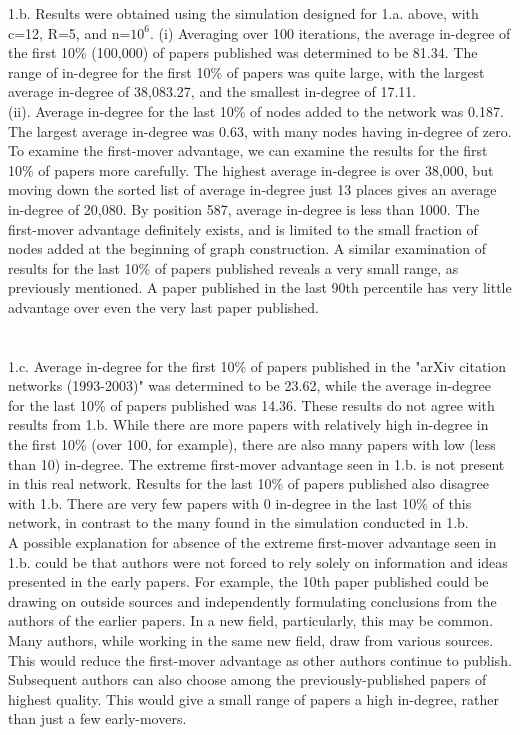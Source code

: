 \documentclass[11pt, oneside]{article}   	%
\begin{document}
 1.b.  Results were obtained using the simulation designed for 1.a. above, with c=12, R=5, and n=$10^6$.
 (i)  Averaging over 100 iterations, the average in-degree of the first 10\% (100,000) of papers published was determined to be 81.34.  The range of in-degree for the first 10\% of papers was quite large, with the largest average in-degree of 38,083.27, and the smallest in-degree of  17.11.\\
 (ii).  Average in-degree for the last 10\% of nodes added to the network was 0.187.  The largest average in-degree was 0.63, with many nodes having in-degree of zero.\\
 \indent To examine the first-mover advantage, we can examine the results for the first 10\% of papers more carefully.  The highest average in-degree is over 38,000, but moving down the sorted list of average in-degree just 13 places gives an average in-degree of 20,080.  By position 587, average in-degree is less than 1000.  The first-mover advantage definitely exists, and is limited to the small fraction of nodes added at the beginning of graph construction.  A similar examination of results for the last 10\% of papers published reveals a very small range, as previously mentioned.  A paper published in the last 90th percentile has very little advantage over even the very last paper published.\\\\\\
 1.c.  Average in-degree for the first 10\% of papers published in the "arXiv citation networks (1993-2003)" was determined to be 23.62, while the average in-degree for the last 10\% of papers published was 14.36.  These results do not agree with results from 1.b.  While there are more papers with relatively high in-degree in the first 10\% (over 100, for example), there are also many papers with low (less than 10) in-degree.  The extreme first-mover advantage seen in 1.b. is not present in this real network.  Results for the last 10\% of papers published also disagree with 1.b.  There are very few papers with 0 in-degree in the last 10\% of this network, in contrast to the many found in the simulation conducted in 1.b.\\
 \indent A possible explanation for absence of the extreme first-mover advantage seen in 1.b. could be that authors were not forced to rely solely on information and ideas presented in the early papers.  For example, the 10th paper published could be drawing on outside sources and independently formulating conclusions from the authors of the earlier papers.  In a new field, particularly, this may be common.  Many authors, while working in the same new field, draw from various sources.  This would reduce the first-mover advantage as other authors continue to publish.  Subsequent authors can also choose among the previously-published papers of highest quality.  This would give a small range of papers a high in-degree,  rather than just a few early-movers.\\\\\\
\end{document}
